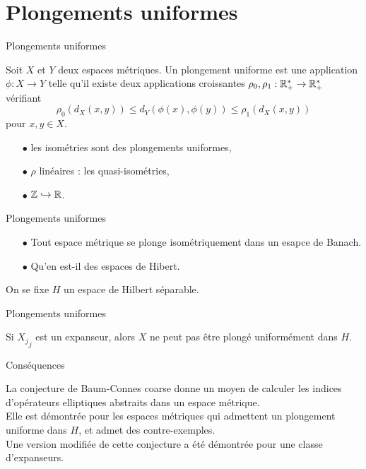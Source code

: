 \section{Plongements uniformes}
\begin{frame}{Plongements uniformes}

\begin{defn}
Soit $X$ et $Y$ deux espaces métriques. Un plongement uniforme est une application $\phi : X\rightarrow Y$ telle qu'il existe deux applications croissantes $\rho_0,\rho_1 : \mathbb R_+^*\rightarrow \mathbb R_+^*$ vérifiant
\[\rho_0(d_X(x,y))\leq d_Y(\phi(x),\phi(y))\leq \rho_1(d_X(x,y))\] 
pour $x,y\in X$.
\end{defn}

\begin{itemize}
\item[$\bullet$] les isométries sont des plongements uniformes,
\item[$\bullet$] $\rho$ linéaires : les quasi-isométries,
\item[$\bullet$] $\mathbb Z\hookrightarrow \mathbb R$.
\end{itemize}
\end{frame}

\begin{frame}{Plongements uniformes} 
\begin{itemize}
\item[$\bullet$] Tout espace métrique se plonge isométriquement dans un esapce de Banach.
\item[$\bullet$] Qu'en est-il des espaces de Hibert.
\end{itemize}
On se fixe $H$ un espace de Hilbert séparable.
\end{frame}

\begin{frame}{Plongements uniformes} 
\begin{thm}
Si ${X_j}_j$ est un expanseur, alors $X$ ne peut pas être plongé uniformément dans $H$.
\end{thm}
\end{frame}

\begin{frame}{Conséquences} 

La conjecture de Baum-Connes coarse donne un moyen de calculer les indices d'opérateurs elliptiques abstraits dans un espace métrique.\\
Elle est démontrée pour les espaces métriques qui admettent un plongement uniforme dans $H$, et admet des contre-exemples.\\
Une version modifiée de cette conjecture a été démontrée pour une classe d'expanseurs. \\
\end{frame}
